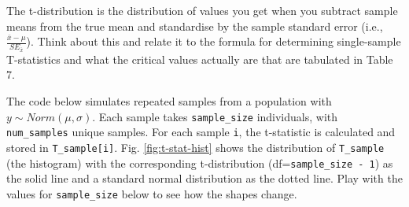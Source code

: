 \documentclass[
  11pt,
  a4paper,
]{book}
\begin{document}
The t-distribution is the distribution of values you get when you subtract sample means from the true mean and standardise by the sample standard error (i.e., \(\frac{\bar{x} - \mu}{SE_{\bar{x}}}\)). Think about this and relate it to the formula for determining single-sample T-statistics and what the critical values actually are that are tabulated in Table 7.

The code below simulates repeated samples from a population with \(y \sim Norm(\mu, \sigma)\). Each sample takes \texttt{sample\_size} individuals, with \texttt{num\_samples} unique samples. For each sample \texttt{i}, the t-statistic is calculated and stored in \texttt{T\_sample{[}i{]}}. Fig. \ref{fig:t-stat-hist} shows the distribution of \texttt{T\_sample} (the histogram) with the corresponding t-distribution (df=\texttt{sample\_size\ -\ 1}) as the solid line and a standard normal distribution as the dotted line. Play with the values for \texttt{sample\_size} below to see how the shapes change.
\end{document}
